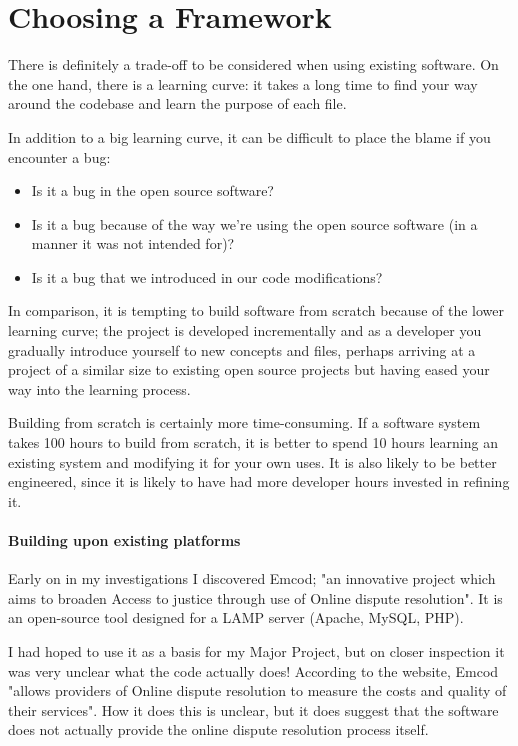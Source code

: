 \chapter{Choosing a Framework}\label{appendix:choosingAFramework}


There is definitely a trade-off to be considered when using existing software. On the one hand, there is a learning curve: it takes a long time to find your way around the codebase and learn the purpose of each file.

In addition to a big learning curve, it can be difficult to place the blame if you encounter a bug:

\begin{itemize}
\item Is it a bug in the open source software?
\item Is it a bug because of the way we're using the open source software (in a manner it was not intended for)?
\item Is it a bug that we introduced in our code modifications?
\end{itemize}

In comparison, it is tempting to build software from scratch because of the lower learning curve; the project is developed incrementally and as a developer you gradually introduce yourself to new concepts and files, perhaps arriving at a project of a similar size to existing open source projects but having eased your way into the learning process.

Building from scratch is certainly more time-consuming. If a software system takes 100 hours to build from scratch, it is better to spend 10 hours learning an existing system and modifying it for your own uses. It is also likely to be better engineered, since it is likely to have had more developer hours invested in refining it.

\subsubsection{Building upon existing platforms}

Early on in my investigations I discovered Emcod; "an innovative project which aims to broaden Access to justice through use of Online dispute resolution". It is an open-source tool designed for a LAMP server (Apache, MySQL, PHP).

I had hoped to use it as a basis for my Major Project, but on closer inspection it was very unclear what the code actually does! According to the website, Emcod "allows providers of Online dispute resolution to measure the costs and quality of their services". How it does this is unclear, but it does suggest that the software does not actually provide the online dispute resolution process itself.

